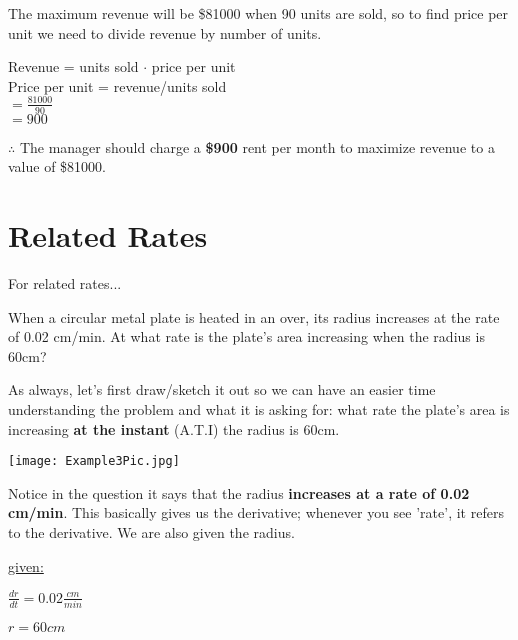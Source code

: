 \documentclass[12pt,fleqn]{book} %
\begin{document}
\noindent The maximum revenue will be \$81000 when 90 units are sold, so to find price per unit we need to divide revenue by number of units.

\begin{center}
    Revenue = units sold $\cdot$ price per unit \\
    Price per unit = revenue/units sold \\
    $= \frac{81000}{90}$ \\
    $=900$
\end{center}

\noindent $\therefore$ The manager should charge a \textbf{\$900} rent per month to maximize revenue to a value of \$81000.

\section{Related Rates}

For related rates...

\vspace*{5mm}


\noindent When a circular metal plate is heated in an over, its radius increases at the rate of 0.02 cm/min. At what rate is the plate's area increasing
when the radius is 60cm?

\vspace*{2mm}

\noindent As always, let's first draw/sketch it out so we can have an easier time understanding the problem and what it is asking for: what rate the plate's area
is increasing \textbf{at the instant} (A.T.I) the radius is 60cm.

\begin{center}
    \texttt{[image: Example3Pic.jpg]}
\end{center}

\noindent Notice in the question it says that the radius \textbf{increases at a rate of 0.02 cm/min}. This basically gives us the derivative; whenever you see
'rate', it refers to the derivative. We are also given the radius.

\begin{center}
    \underline{given:}
    \begin{multicols}{2}
        $\frac{dr}{dt}=0.02 \frac{cm}{min}$

        $r=60cm$
    \end{multicols}
\end{center}
\end{document}
